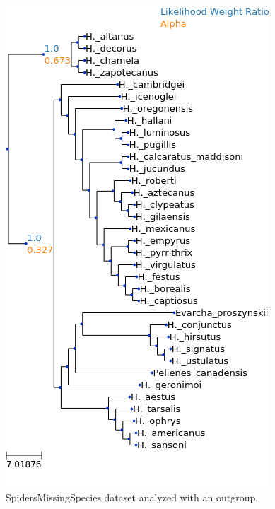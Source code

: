 \documentclass{article}
\begin{document}
\begin{figure}
  \begin{center}

    \includegraphics[width=.75\linewidth]{
      figs/spiders/missing_species_outgroup_lwr.png}
    \caption{SpidersMissingSpecies dataset analyzed with an outgroup.}
    \label{fig:spiders-missing-species-outgroup}
  \end{center}
\end{figure}
\end{document}
